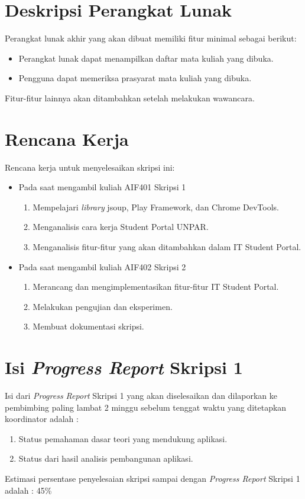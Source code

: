 \documentclass[a4paper,twoside]{article}
\begin{document}
\section{Deskripsi Perangkat Lunak}
Perangkat lunak akhir yang akan dibuat memiliki fitur minimal sebagai berikut:
\begin{itemize}
	\item Perangkat lunak dapat menampilkan daftar mata kuliah yang dibuka.
	\item Pengguna dapat memeriksa prasyarat mata kuliah yang dibuka.
\end{itemize}
Fitur-fitur lainnya akan ditambahkan setelah melakukan wawancara.

\section{Rencana Kerja}
Rencana kerja untuk menyelesaikan skripsi ini:
\begin{itemize}
	\item Pada saat mengambil kuliah AIF401 Skripsi 1
	\begin{enumerate}
		\item Mempelajari \textit{library} jsoup, Play Framework, dan Chrome DevTools.
		\item Menganalisis cara kerja Student Portal UNPAR.
		\item Menganalisis fitur-fitur yang akan ditambahkan dalam IT Student Portal.
	\end{enumerate}
	\item Pada saat mengambil kuliah AIF402 Skripsi 2
	\begin{enumerate}
		\item Merancang dan mengimplementasikan fitur-fitur IT Student Portal. 
		\item Melakukan pengujian dan eksperimen.
		\item Membuat dokumentasi skripsi.
	\end{enumerate}
\end{itemize}

\section{Isi {\it Progress Report} Skripsi 1}
Isi dari {\it Progress Report} Skripsi 1 yang akan diselesaikan dan dilaporkan ke pembimbing paling lambat 2 minggu sebelum tenggat waktu yang ditetapkan koordinator adalah :
\begin{enumerate}
	\item Status pemahaman dasar teori yang mendukung aplikasi.
	\item Status dari hasil analisis pembangunan aplikasi.
\end{enumerate}
Estimasi persentase penyelesaian skripsi sampai dengan {\it Progress Report} Skripsi 1 adalah : 45\%
\end{document}
